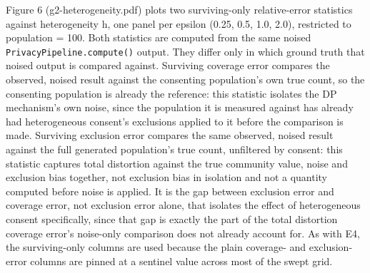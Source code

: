 Figure 6 (g2-heterogeneity.pdf) plots two surviving-only relative-error statistics against heterogeneity h, one panel per epsilon (0.25, 0.5, 1.0, 2.0), restricted to population = 100. Both statistics are computed from the same noised \texttt{PrivacyPipeline.compute()} output. They differ only in which ground truth that noised output is compared against. Surviving coverage error compares the observed, noised result against the consenting population's own true count, so the consenting population is already the reference: this statistic isolates the DP mechanism's own noise, since the population it is measured against has already had heterogeneous consent's exclusions applied to it before the comparison is made. Surviving exclusion error compares the same observed, noised result against the full generated population's true count, unfiltered by consent: this statistic captures total distortion against the true community value, noise and exclusion bias together, not exclusion bias in isolation and not a quantity computed before noise is applied. It is the gap between exclusion error and coverage error, not exclusion error alone, that isolates the effect of heterogeneous consent specifically, since that gap is exactly the part of the total distortion coverage error's noise-only comparison does not already account for. As with E4, the surviving-only columns are used because the plain coverage- and exclusion-error columns are pinned at a sentinel value across most of the swept grid.

